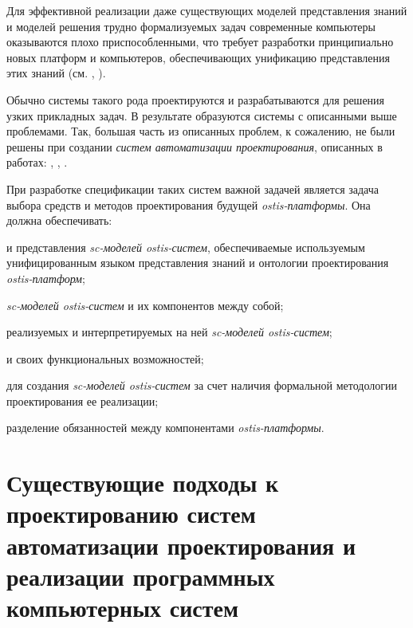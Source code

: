 \begin{textitemize}
   \item Для эффективной реализации даже существующих моделей представления знаний и моделей решения трудно формализуемых задач современные компьютеры оказываются плохо приспособленными, что требует разработки принципиально новых платформ и компьютеров, обеспечивающих унификацию представления этих знаний (см. , ).
\end{textitemize}

Обычно системы такого рода проектируются и разрабатываются для решения узких прикладных задач. В результате образуются системы с описанными выше проблемами. Так, большая часть из описанных проблем, к сожалению, не были решены при создании \textit{систем автоматизации проектирования}, описанных в работах: , , .

При разработке спецификации таких систем важной задачей является задача выбора средств и методов проектирования будущей \textit{ostis-платформы}. Она должна обеспечивать:

\begin{textitemize}
    \item {} и представления \textit{sc-моделей ostis-систем}, обеспечиваемые используемым унифицированным языком представления знаний и онтологии проектирования \textit{ostis-платформ};
    \item {} \textit{sc-моделей ostis-систем} и их компонентов между собой;
    \item {} реализуемых и интерпретируемых на ней \textit{sc-моделей ostis-систем};
    \item {} и  своих функциональных возможностей;
    \item {} для создания \textit{sc-моделей ostis-систем} за счет наличия формальной методологии проектирования ее реализации;
    \item разделение обязанностей между компонентами \textit{ostis-платформы}.
\end{textitemize}

\section{Существующие подходы к проектированию систем автоматизации проектирования и реализации программных компьютерных систем}
\label{sec_soft_platform_problems}

